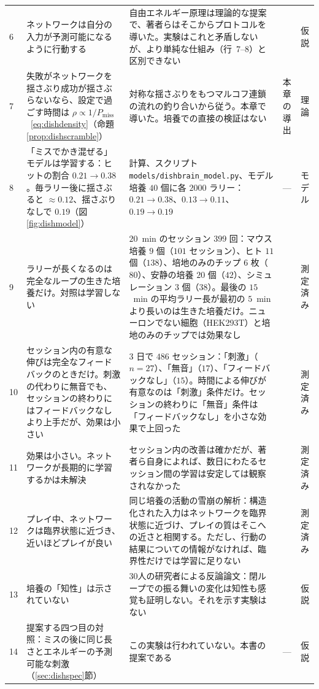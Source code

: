 {\begin{longtable}{>{\raggedright}p{0.5cm}>{\raggedright}p{4.0cm}>{\raggedright}p{5.6cm}>{\raggedright}p{2.3cm}>{\raggedright\arraybackslash}p{1.7cm}}
6 & ネットワークは自分の入力が予測可能になるように行動する & 自由エネルギー原理は理論的な提案で、著者らはそこからプロトコルを導いた。実験はこれと矛盾しないが、より単純な仕組み（行~7--8）と区別できない & \cite{Friston2010,Kagan2022} & 仮説 \\
7 & 失敗がネットワークを揺さぶり成功が揺さぶらないなら、設定で過ごす時間は $\rho\propto1/P_{\text{miss}}$~\eqref{eq:dishdensity}（命題\ref{prop:dishscramble}） & 対称な揺さぶりをもつマルコフ連鎖の流れの釣り合いから従う。本章で導いた。培養での直接の検証はない & 本章の導出 & 理論 \\
8 & 「ミスでかき混ぜる」モデルは学習する：ヒットの割合 $0.21\to0.38$。毎ラリー後に揺さぶると $\approx0.12$、揺さぶりなしで $0.19$（図\ref{fig:dishmodel}） & 計算、スクリプト \texttt{models/dishbrain\_model.py}、モデル培養 $40$ 個に各 $2000$ ラリー：$0.21\to0.38$、$0.13\to0.11$、$0.19\to0.19$ & --- & モデル \\
9 & ラリーが長くなるのは完全なループの生きた培養だけ。対照は学習しない & $20$~min のセッション $399$ 回：マウス培養 $9$ 個（$101$ セッション）、ヒト $11$ 個（$138$）、培地のみのチップ $6$ 枚（$80$）、安静の培養 $20$ 個（$42$）、シミュレーション $3$ 個（$38$）。最後の $15$~min の平均ラリー長が最初の $5$~min より長いのは生きた培養だけ。ニューロンでない細胞（HEK293T）と培地のみのチップでは効果なし & \cite{Kagan2022} & 測定済み \\
10 & セッション内の有意な伸びは完全なフィードバックのときだけ。刺激の代わりに無音でも、セッションの終わりにはフィードバックなしより上手だが、効果は小さい & $3$ 日で $486$ セッション：「刺激」（$n=27$）、「無音」（$17$）、「フィードバックなし」（$15$）。時間による伸びが有意なのは「刺激」条件だけ。セッションの終わりに「無音」条件は「フィードバックなし」を小さな効果で上回った & \cite{Kagan2022} & 測定済み \\
11 & 効果は小さい。ネットワークが長期的に学習するかは未解決 & セッション内の改善は確かだが、著者ら自身によれば、数日にわたるセッション間の学習は安定しては観察されなかった & \cite{Kagan2022} & 測定済み \\
12 & プレイ中、ネットワークは臨界状態に近づき、近いほどプレイが良い & 同じ培養の活動の雪崩の解析：構造化された入力はネットワークを臨界状態に近づけ、プレイの質はそこへの近さと相関する。ただし、行動の結果についての情報がなければ、臨界性だけでは学習に足りない & \cite{Habibollahi2023} & 測定済み \\
13 & 培養の「知性」は示されていない & 30人の研究者による反論論文：閉ループでの振る舞いの変化は知性も感覚も証明しない。それを示す実験はない & \cite{Balci2023} & 仮説 \\
14 & 提案する四つ目の対照：ミスの後に同じ長さとエネルギーの予測可能な刺激（\ref{sec:dishspec}節） & この実験は行われていない。本書の提案である & --- & 仮説 \\
\bottomrule
\end{longtable}}
